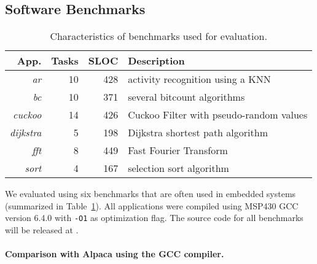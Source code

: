 \subsection{Software Benchmarks}
\label{sec:software_benchmarks}

\begin{table}
	\centering
	\footnotesize
	\begin{tabular}{| r|r|r | p{} |}
		\hline
		App.&Tasks&SLOC&Description\\
		\hline\hline
        \emph{ar} &10 &428 & activity recognition using a KNN\\ %
		\hline
        \emph{bc} &10 &371 & several bitcount algorithms\\
		\hline
        \emph{cuckoo} &14 &426 & Cuckoo Filter with pseudo-random values\\
		\hline
        \emph{dijkstra} &5 &198 & Dijkstra shortest path algorithm \\
		\hline
        \emph{fft} &8 &449 & Fast Fourier Transform\\ %
		\hline
		\emph{sort} &4 &167 & selection sort algorithm\\
		\hline
	\end{tabular}
\caption{Characteristics of benchmarks used for evaluation.}
\label{table:benchmark_table}
\end{table}

We evaluated \sys using six benchmarks that are often used in embedded systems (summarized in Table~\ref{table:benchmark_table}). All applications were compiled using MSP430 GCC~\cite{ti-gcc} version 6.4.0 with \texttt{-O1} as optimization flag. The source code for all benchmarks will be released at \cite{coala_website}.

\paragraph{Comparison with Alpaca using the GCC compiler.}

